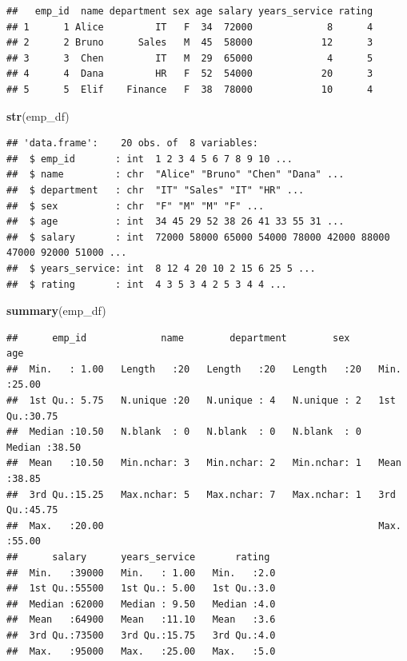 \documentclass[
]{article}
\newenvironment{Shaded}{\begin{snugshade}}{\end{snugshade}}
\newcommand{\FunctionTok}[1]{\textcolor[rgb]{0.13,0.29,0.53}{\textbf{#1}}}
\newcommand{\NormalTok}[1]{#1}
\begin{document}
\begin{verbatim}
##   emp_id  name department sex age salary years_service rating
## 1      1 Alice         IT   F  34  72000             8      4
## 2      2 Bruno      Sales   M  45  58000            12      3
## 3      3  Chen         IT   M  29  65000             4      5
## 4      4  Dana         HR   F  52  54000            20      3
## 5      5  Elif    Finance   F  38  78000            10      4
\end{verbatim}

\begin{Shaded}
\begin{Highlighting}[]
\FunctionTok{str}\NormalTok{(emp\_df)}
\end{Highlighting}
\end{Shaded}

\begin{verbatim}
## 'data.frame':    20 obs. of  8 variables:
##  $ emp_id       : int  1 2 3 4 5 6 7 8 9 10 ...
##  $ name         : chr  "Alice" "Bruno" "Chen" "Dana" ...
##  $ department   : chr  "IT" "Sales" "IT" "HR" ...
##  $ sex          : chr  "F" "M" "M" "F" ...
##  $ age          : int  34 45 29 52 38 26 41 33 55 31 ...
##  $ salary       : int  72000 58000 65000 54000 78000 42000 88000 47000 92000 51000 ...
##  $ years_service: int  8 12 4 20 10 2 15 6 25 5 ...
##  $ rating       : int  4 3 5 3 4 2 5 3 4 4 ...
\end{verbatim}

\begin{Shaded}
\begin{Highlighting}[]
\FunctionTok{summary}\NormalTok{(emp\_df)}
\end{Highlighting}
\end{Shaded}

\begin{verbatim}
##      emp_id             name        department        sex          age       
##  Min.   : 1.00   Length   :20   Length   :20   Length   :20   Min.   :25.00  
##  1st Qu.: 5.75   N.unique :20   N.unique : 4   N.unique : 2   1st Qu.:30.75  
##  Median :10.50   N.blank  : 0   N.blank  : 0   N.blank  : 0   Median :38.50  
##  Mean   :10.50   Min.nchar: 3   Min.nchar: 2   Min.nchar: 1   Mean   :38.85  
##  3rd Qu.:15.25   Max.nchar: 5   Max.nchar: 7   Max.nchar: 1   3rd Qu.:45.75  
##  Max.   :20.00                                                Max.   :55.00  
##      salary      years_service       rating   
##  Min.   :39000   Min.   : 1.00   Min.   :2.0  
##  1st Qu.:55500   1st Qu.: 5.00   1st Qu.:3.0  
##  Median :62000   Median : 9.50   Median :4.0  
##  Mean   :64900   Mean   :11.10   Mean   :3.6  
##  3rd Qu.:73500   3rd Qu.:15.75   3rd Qu.:4.0  
##  Max.   :95000   Max.   :25.00   Max.   :5.0
\end{verbatim}
\end{document}
